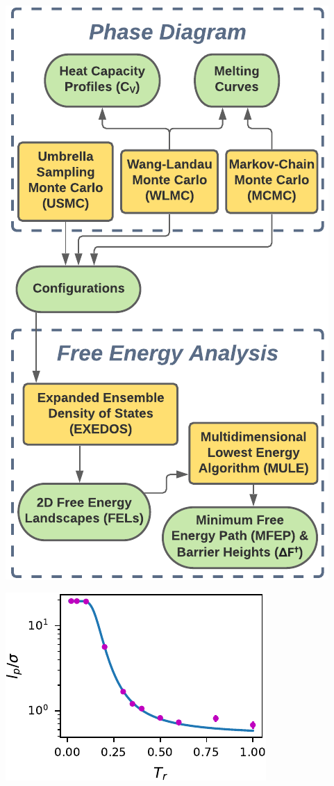 \documentclass[aspectratio=169]{beamer}
\begin{document}
\begin{frame}[c]{}

  \centering
  \includegraphics[height=\textheight]{../figures/ch4_jcp_from_diss/fig-MCFEL_toolkit_connections/fig-MCFEL_toolkit_connections_V3.pdf}

\end{frame}

\begin{frame}[c]{}

  \centering
  \includegraphics[height=\textheight]{../figures/fig-step_lp_vs_T/fig-lp_vs_T.pdf}

\end{frame}
\end{document}
